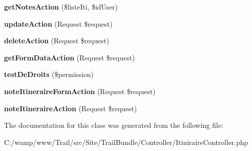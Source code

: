 \begin{DoxyCompactItemize}
\item 
\hypertarget{class_site_1_1_trail_bundle_1_1_controller_1_1_itiniraire_controller_a1d567966b75500791e9560f809a5102b}{}{\bfseries get\+Notes\+Action} (\$liste\+Iti, \$id\+User)\label{class_site_1_1_trail_bundle_1_1_controller_1_1_itiniraire_controller_a1d567966b75500791e9560f809a5102b}

\item 
\hypertarget{class_site_1_1_trail_bundle_1_1_controller_1_1_itiniraire_controller_a131b5595bafc63808ae8cdbc0b9acbd0}{}{\bfseries update\+Action} (Request \$request)\label{class_site_1_1_trail_bundle_1_1_controller_1_1_itiniraire_controller_a131b5595bafc63808ae8cdbc0b9acbd0}

\item 
\hypertarget{class_site_1_1_trail_bundle_1_1_controller_1_1_itiniraire_controller_a20de2cd669b929272ee2ce99e2d3c988}{}{\bfseries delete\+Action} (Request \$request)\label{class_site_1_1_trail_bundle_1_1_controller_1_1_itiniraire_controller_a20de2cd669b929272ee2ce99e2d3c988}

\item 
\hypertarget{class_site_1_1_trail_bundle_1_1_controller_1_1_itiniraire_controller_a59b310fdfbb086c41c5ee4bffa354ffe}{}{\bfseries get\+Form\+Data\+Action} (Request \$request)\label{class_site_1_1_trail_bundle_1_1_controller_1_1_itiniraire_controller_a59b310fdfbb086c41c5ee4bffa354ffe}

\item 
\hypertarget{class_site_1_1_trail_bundle_1_1_controller_1_1_itiniraire_controller_a49387e8719305355ba3fae06b0b9bc2a}{}{\bfseries test\+De\+Droits} (\$permission)\label{class_site_1_1_trail_bundle_1_1_controller_1_1_itiniraire_controller_a49387e8719305355ba3fae06b0b9bc2a}

\item 
\hypertarget{class_site_1_1_trail_bundle_1_1_controller_1_1_itiniraire_controller_aa28c4b6cdf4ba7450fc93e536ddff98a}{}{\bfseries note\+Itineraire\+Form\+Action} (Request \$request)\label{class_site_1_1_trail_bundle_1_1_controller_1_1_itiniraire_controller_aa28c4b6cdf4ba7450fc93e536ddff98a}

\item 
\hypertarget{class_site_1_1_trail_bundle_1_1_controller_1_1_itiniraire_controller_a45ca36383f6326530a1899325844089d}{}{\bfseries note\+Itineraire\+Action} (Request \$request)\label{class_site_1_1_trail_bundle_1_1_controller_1_1_itiniraire_controller_a45ca36383f6326530a1899325844089d}

\end{DoxyCompactItemize}


The documentation for this class was generated from the following file\+:\begin{DoxyCompactItemize}
\item 
C\+:/wamp/www/\+Trail/src/\+Site/\+Trail\+Bundle/\+Controller/Itiniraire\+Controller.\+php\end{DoxyCompactItemize}
